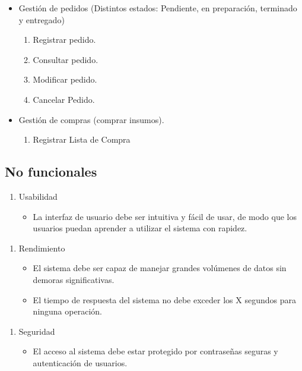 \documentclass{article}
\begin{document}
\begin{itemize}
	\item Gestión de pedidos (Distintos estados: Pendiente, en preparación, terminado y entregado)
	\begin{enumerate}[start=20]
		\item Registrar pedido.
		\item Consultar pedido.
		\item Modificar pedido.
		\item Cancelar Pedido.
	\end{enumerate}
\end{itemize}

\begin{itemize}
	\item Gestión de compras (comprar insumos).
	\begin{enumerate}[start=24]
		\item Registrar Lista de Compra
	\end{enumerate}
\end{itemize}

\subsection{No funcionales}
\begin{enumerate}
	\item Usabilidad
	\begin{itemize}
		\item La interfaz de usuario debe ser intuitiva y fácil de usar, de modo que los usuarios puedan aprender a utilizar el sistema con rapidez.
	\end{itemize}
\end{enumerate}

\begin{enumerate}[start=2]
	\item Rendimiento
	\begin{itemize}
		\item El sistema debe ser capaz de manejar grandes volúmenes de datos sin demoras significativas.
		\item El tiempo de respuesta del sistema no debe exceder los X segundos para ninguna operación.
	\end{itemize}
\end{enumerate}

\clearpage
\begin{enumerate}[start=3]
	\item Seguridad
	\begin{itemize}
		\item El acceso al sistema debe estar protegido por contraseñas seguras y autenticación de usuarios.
	\end{itemize}
\end{enumerate}
\end{document}
